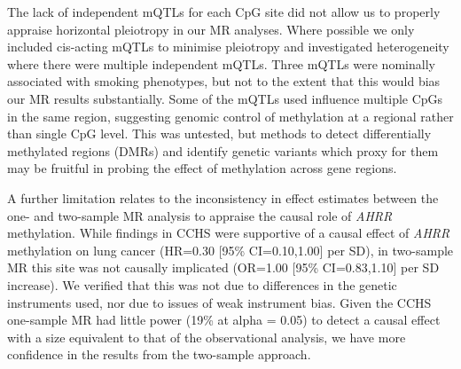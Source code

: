 \documentclass[11pt,oneside]{bristolthesis}
\begin{document}
The lack of independent mQTLs for each CpG site did not allow us to properly appraise horizontal pleiotropy in our MR analyses. Where possible we only included cis-acting mQTLs to minimise pleiotropy and investigated heterogeneity where there were multiple independent mQTLs. Three mQTLs were nominally associated with smoking phenotypes, but not to the extent that this would bias our MR results substantially. Some of the mQTLs used influence multiple CpGs in the same region, suggesting genomic control of methylation at a regional rather than single CpG level. This was untested, but methods to detect differentially methylated regions (DMRs) and identify genetic variants which proxy for them may be fruitful in probing the effect of methylation across gene regions.

A further limitation relates to the inconsistency in effect estimates between the one- and two-sample MR analysis to appraise the causal role of \emph{AHRR} methylation. While findings in CCHS were supportive of a causal effect of \emph{AHRR} methylation on lung cancer (HR=0.30 {[}95\% CI=0.10,1.00{]} per SD), in two-sample MR this site was not causally implicated (OR=1.00 {[}95\% CI=0.83,1.10{]} per SD increase). We verified that this was not due to differences in the genetic instruments used, nor due to issues of weak instrument bias. Given the CCHS one-sample MR had little power (19\% at alpha = 0.05) to detect a causal effect with a size equivalent to that of the observational analysis, we have more confidence in the results from the two-sample approach.
\end{document}
